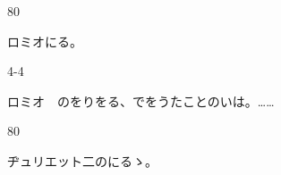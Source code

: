 \documentclass[tate,paper=b6j,jafontsize=9pt]{jlreq}
\begin{document}

\begin{azconvIndented}{8\zw}{0\zw}

ロミオにる。

\end{azconvIndented}
\begin{azconvIndented}{4\zw}{-4\zw}

ロミオ　のをりをる、でをうたことのいは。……

\end{azconvIndented}
\begin{azconvIndented}{8\zw}{0\zw}

ヂュリエット二のにるゝ。

\end{azconvIndented}
\end{document}
